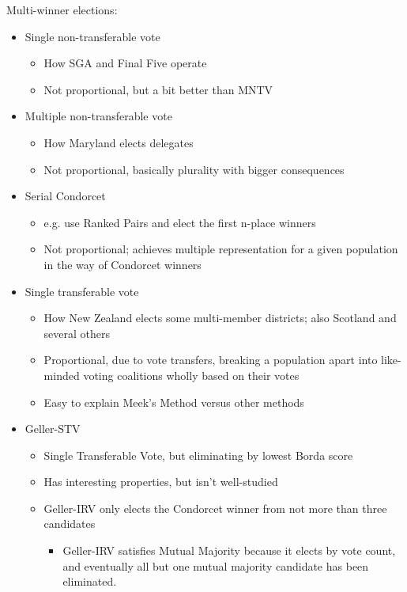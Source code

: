 Multi-winner elections:
\begin{itemize}
    \item Single non-transferable vote
    \begin{itemize}
        \item How SGA and Final Five operate
        \item Not proportional, but a bit better than MNTV
    \end{itemize}

    \item Multiple non-transferable vote
    \begin{itemize}
        \item How Maryland elects delegates
        \item Not proportional, basically plurality with bigger consequences
    \end{itemize}

    \item Serial Condorcet
    \begin{itemize}
        \item e.g. use Ranked Pairs and elect the first n-place winners
        \item Not proportional; achieves multiple representation for a given population in the way of Condorcet winners
    \end{itemize}

    \item Single transferable vote
    \begin{itemize}
        \item How New Zealand elects some multi-member districts; also Scotland and several others
        \item Proportional, due to vote transfers, breaking a population apart into like-minded voting coalitions wholly based on their votes
        \item Easy to explain Meek's Method versus other methods
    \end{itemize}

    \item Geller-STV
    \begin{itemize}
        \item Single Transferable Vote, but eliminating by lowest Borda score

        \item Has interesting properties, but isn't well-studied

        \item Geller-IRV only elects the Condorcet winner from not more than three candidates
        \begin{itemize}
            \item Geller-IRV satisfies Mutual Majority because it elects by vote count, and eventually all but one mutual majority candidate has been eliminated.


\end{itemize}
\end{itemize}
\end{itemize}
